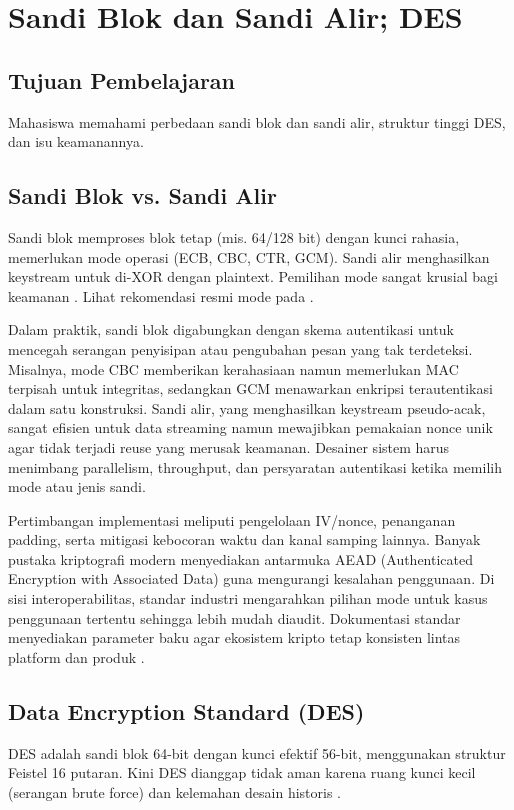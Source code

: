 \documentclass[../main.tex]{subfiles}
\begin{document}
\chapter{Sandi Blok dan Sandi Alir; DES}

\section{Tujuan Pembelajaran}
Mahasiswa memahami perbedaan sandi blok dan sandi alir, struktur tinggi DES, dan isu keamanannya.

\section{Sandi Blok vs. Sandi Alir}
Sandi blok memproses blok tetap (mis. 64/128 bit) dengan kunci rahasia, memerlukan mode operasi (ECB, CBC, CTR, GCM). Sandi alir menghasilkan keystream untuk di-XOR dengan plaintext. Pemilihan mode sangat krusial bagi keamanan \citep{stallings,menezes}. Lihat rekomendasi resmi mode pada \citep{nist_sp_800_38a,nist_sp_800_38d}.

Dalam praktik, sandi blok digabungkan dengan skema autentikasi untuk mencegah serangan penyisipan atau pengubahan pesan yang tak terdeteksi. Misalnya, mode CBC memberikan kerahasiaan namun memerlukan MAC terpisah untuk integritas, sedangkan GCM menawarkan enkripsi terautentikasi dalam satu konstruksi. Sandi alir, yang menghasilkan keystream pseudo-acak, sangat efisien untuk data streaming namun mewajibkan pemakaian nonce unik agar tidak terjadi reuse yang merusak keamanan. Desainer sistem harus menimbang parallelism, throughput, dan persyaratan autentikasi ketika memilih mode atau jenis sandi.

Pertimbangan implementasi meliputi pengelolaan IV/nonce, penanganan padding, serta mitigasi kebocoran waktu dan kanal samping lainnya. Banyak pustaka kriptografi modern menyediakan antarmuka AEAD (Authenticated Encryption with Associated Data) guna mengurangi kesalahan penggunaan. Di sisi interoperabilitas, standar industri mengarahkan pilihan mode untuk kasus penggunaan tertentu sehingga lebih mudah diaudit. Dokumentasi standar menyediakan parameter baku agar ekosistem kripto tetap konsisten lintas platform dan produk \citep{nist_sp_800_38a,nist_sp_800_38d}.

\section{Data Encryption Standard (DES)}
DES adalah sandi blok 64-bit dengan kunci efektif 56-bit, menggunakan struktur Feistel 16 putaran. Kini DES dianggap tidak aman karena ruang kunci kecil (serangan brute force) dan kelemahan desain historis \citep{nist_des,stallings}.
\end{document}
